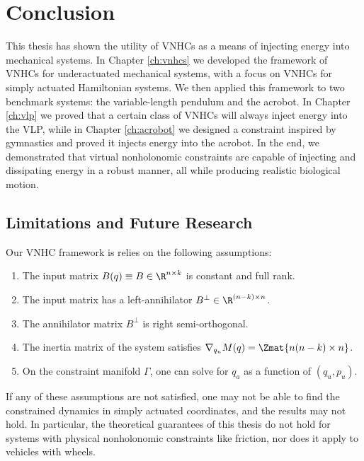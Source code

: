 

\chapter{Conclusion}\label{ch:conclusion}

This thesis has shown the utility of VNHCs as a means of injecting energy into
mechanical systems.
In Chapter \ref{ch:vnhcs} we developed the framework of VNHCs for underactuated
mechanical systems, with a focus on VNHCs for simply actuated Hamiltonian
systems.
We then applied this framework to two benchmark systems: the variable-length
pendulum and the acrobot.
In Chapter \ref{ch:vlp} we proved that a certain class of VNHCs will always
inject energy into the VLP, while in Chapter \ref{ch:acrobot} we designed a
constraint inspired by gymnastics and proved it injects energy into the
acrobot.
In the end, we demonstrated that virtual nonholonomic constraints are capable of
injecting and dissipating energy in a robust manner, all while producing
realistic biological motion.

\section{Limitations and Future Research}
Our VNHC framework is relies on the following assumptions:
\begin{enumerate}
    \item The input matrix \(B(q) \equiv B \in \R^{n \times k}\) is constant and
        full rank.
    \item The input matrix has a left-annihilator 
        \(B^\perp \in \R^{(n-k)\times n}\). 
    \item The annihilator matrix \(B^\perp\) is right semi-orthogonal.
    \item The inertia matrix of the system satisfies 
        \(\nabla_{q_u}M(q) = \Zmat{n(n-k) \times n}\).
    \item On the constraint manifold \(\Gamma\), one can solve for \(q_a\) as a
        function of \((q_u,p_u)\).
\end{enumerate}
If any of these assumptions are not satisfied, one may not be able to find the
constrained dynamics in simply actuated coordinates, and the results may not
hold.
In particular, the theoretical guarantees of this thesis do not hold for systems
with physical nonholonomic constraints like friction, nor does it apply to vehicles
with wheels.

